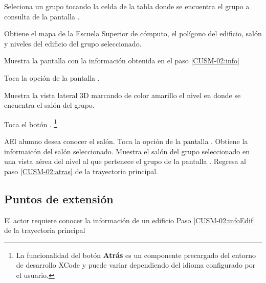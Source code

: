  \begin{UCtrayectoria}
 \UCpaso[\UCactor] Seleciona un grupo tocando la celda de la tabla donde se encuentra el grupo a consulta de la pantalla .

\UCpaso[\UCsist] Obtiene el mapa  de la Escuela Superior de cómputo, el polígono del edificio, salón y niveles del edificio del grupo seleccionado. \label{CUSM-02:info}

\UCpaso[\UCsist] Muestra la pantalla  con la información obtenida en el paso \ref{CUSM-02:info} \label{CUSM-02:infoEdif}

\UCpaso[\UCactor] Toca la opción  de la pantalla .  

\UCpaso[\UCsist] Muestra la vista lateral 3D marcando de color amarillo el nivel  en donde se encuentra el salón del grupo.

\UCpaso[\UCactor] Toca el botón . \label{CUSM-02:atras} \footnote{La funcionalidad del botón \textbf{Atrás} es un componente precargado del entorno de desarrollo XCode y puede variar dependiendo del idioma configurado por el usuario.}

 \end{UCtrayectoria}

 \begin{UCtrayectoriaA}{A}{El alumno desea conocer el salón.}
	\UCpaso[\UCactor] Toca la opción  de la pantalla  .
	\UCpaso[\UCsist] Obtiene la informaicón del salón seleccionado.
	\UCpaso[\UCsist] Muestra el salón del grupo seleccionado en una vista aérea del nivel al que pertenece el grupo de la pantalla .
	\UCpaso[\UCsist] Regresa al paso \ref{CUSM-02:atras} de la trayectoria principal.
\end{UCtrayectoriaA}




%    
%   
% 

 
\subsection{Puntos de extensión}
%
\UCExtensionPoint
{El actor requiere conocer la información de un edificio}
{ Paso \ref{CUSM-02:infoEdif} de la trayectoria principal}
{}
 